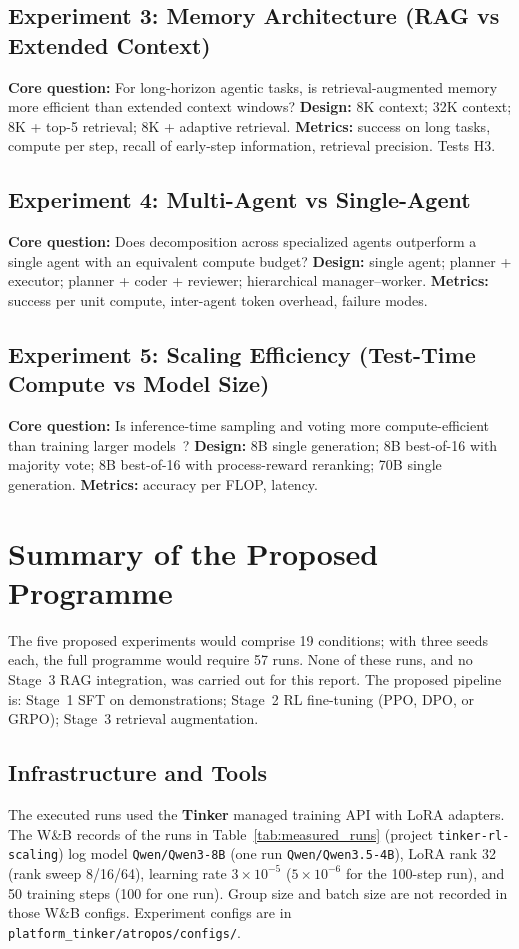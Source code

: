 \documentclass[12pt,a4paper]{report}
\theoremstyle{definition}
\begin{document}
\subsection*{Experiment 3: Memory Architecture (RAG vs Extended Context)}
\textbf{Core question:} For long-horizon agentic tasks, is retrieval-augmented memory more efficient than extended context windows? \textbf{Design:} 8K context; 32K context; 8K + top-5 retrieval; 8K + adaptive retrieval. \textbf{Metrics:} success on long tasks, compute per step, recall of early-step information, retrieval precision. Tests H3.

\subsection*{Experiment 4: Multi-Agent vs Single-Agent}
\textbf{Core question:} Does decomposition across specialized agents outperform a single agent with an equivalent compute budget? \textbf{Design:} single agent; planner + executor; planner + coder + reviewer; hierarchical manager--worker. \textbf{Metrics:} success per unit compute, inter-agent token overhead, failure modes.

\subsection*{Experiment 5: Scaling Efficiency (Test-Time Compute vs Model Size)}
\textbf{Core question:} Is inference-time sampling and voting more compute-efficient than training larger models~\cite{snell2024scaling}? \textbf{Design:} 8B single generation; 8B best-of-16 with majority vote; 8B best-of-16 with process-reward reranking; 70B single generation. \textbf{Metrics:} accuracy per FLOP, latency.

\section*{Summary of the Proposed Programme}

The five proposed experiments would comprise 19 conditions; with three seeds each, the full programme would require 57 runs. None of these runs, and no Stage~3 RAG integration, was carried out for this report. The proposed pipeline is: Stage~1 SFT on demonstrations; Stage~2 RL fine-tuning (PPO, DPO, or GRPO); Stage~3 retrieval augmentation.

\subsection{Infrastructure and Tools}
The executed runs used the \textbf{Tinker} managed training API with LoRA adapters. The W\&B records of the runs in Table~\ref{tab:measured_runs} (project \texttt{tinker-rl-scaling}) log model \texttt{Qwen/Qwen3-8B} (one run \texttt{Qwen/Qwen3.5-4B}), LoRA rank 32 (rank sweep 8/16/64), learning rate $3\times10^{-5}$ ($5\times10^{-6}$ for the 100-step run), and 50 training steps (100 for one run). Group size and batch size are not recorded in those W\&B configs. Experiment configs are in \texttt{platform\_tinker/atropos/configs/}.
\end{document}
